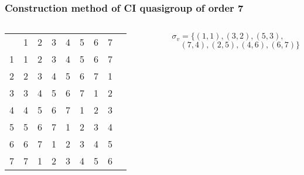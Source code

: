 \begin{frame}
\frametitle{Construction method of CI quasigroup of order 7}
\begin{columns}
	\begin{table}[]
		\begin{tabular}{ccccccccc}
			& 1                      & 2                      & 3                      & 4                      & 5                      & 6                      & 7                      \\ \cline{2-8} 
			\multicolumn{1}{l|}{1} & \multicolumn{1}{l|}{1} & \multicolumn{1}{l|}{2} & \multicolumn{1}{l|}{3} & \multicolumn{1}{l|}{4} & \multicolumn{1}{l|}{5} & \multicolumn{1}{l|}{6} & \multicolumn{1}{l|}{7} \\ \cline{2-8} 
			\multicolumn{1}{l|}{2} & \multicolumn{1}{l|}{2} & \multicolumn{1}{l|}{3} & \multicolumn{1}{l|}{4} & \multicolumn{1}{l|}{5} & \multicolumn{1}{l|}{6} & \multicolumn{1}{l|}{7} & \multicolumn{1}{l|}{1} \\ \cline{2-8} 
			\multicolumn{1}{l|}{3} & \multicolumn{1}{l|}{3} & \multicolumn{1}{l|}{4} & \multicolumn{1}{l|}{5} & \multicolumn{1}{l|}{6} & \multicolumn{1}{l|}{7} & \multicolumn{1}{l|}{1} & \multicolumn{1}{l|}{2} \\ \cline{2-8} 
			\multicolumn{1}{l|}{4} & \multicolumn{1}{l|}{4} & \multicolumn{1}{l|}{5} & \multicolumn{1}{l|}{6} & \multicolumn{1}{l|}{7} & \multicolumn{1}{l|}{1} & \multicolumn{1}{l|}{2} & \multicolumn{1}{l|}{3} \\ \cline{2-8} 
			\multicolumn{1}{l|}{5} & \multicolumn{1}{l|}{5} & \multicolumn{1}{l|}{6} & \multicolumn{1}{l|}{7} & \multicolumn{1}{l|}{1} & \multicolumn{1}{l|}{2} & \multicolumn{1}{l|}{3} & \multicolumn{1}{l|}{4} \\ \cline{2-8} 
			\multicolumn{1}{l|}{6} & \multicolumn{1}{l|}{6} & \multicolumn{1}{l|}{7} & \multicolumn{1}{l|}{1} & \multicolumn{1}{l|}{2} & \multicolumn{1}{l|}{3} & \multicolumn{1}{l|}{4} & \multicolumn{1}{l|}{5} \\ \cline{2-8} 
			\multicolumn{1}{l|}{7} & \multicolumn{1}{l|}{7} & \multicolumn{1}{l|}{1} & \multicolumn{1}{l|}{2} & \multicolumn{1}{l|}{3} & \multicolumn{1}{l|}{4} & \multicolumn{1}{l|}{5} & \multicolumn{1}{l|}{6} \\ \cline{2-8} 
		\end{tabular}
	\end{table}
	$\sigma_v = \{ (1,1), (3,2), (5,3),$ \\
	$ \quad (7,4), (2,5), (4,6), (6,7) \}$
\end{columns}


\end{frame}
